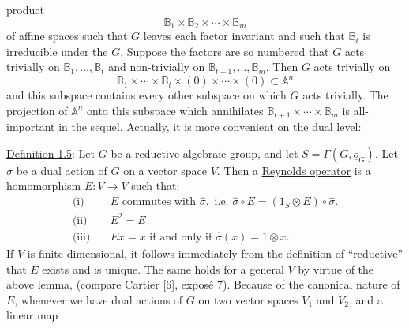 
product
\[
\mathbb B_1\times\mathbb B_2\times\cdots\times\mathbb B_m
\]
of affine spaces such that $G$ leaves each factor invariant and such that $\mathbb B_i$ is irreducible under the  $G$. Suppose the factors are so numbered that $G$ acts trivially on $\mathbb B_1,\ldots,\mathbb B_t$ and non-trivially on $\mathbb B_{t+1},\ldots,\mathbb B_m$. Then $G$ acts trivially on
\[
\mathbb B_1\times\cdots\times\mathbb B_t\times(0)\times\cdots\times(0)\subset\mathbb A^n
\]
and this subspace contains every other subspace on which $G$ acts trivially. The projection of $\mathbb A^n$ onto this subspace which annihilates $\mathbb B_{t+1}\times\cdots\times\mathbb B_m$ is all-important in the sequel. Actually, it is more convenient on the dual level:

\uline{Definition 1.5}: Let $G$ be a reductive algebraic group, and let $S=\Gamma(G,\underline{o}_G)$. Let $\hat\sigma$ be a dual action of $G$ on a vector space $V$. Then a \uline{Reynolds operator} is a homomorphism $E:V\longrightarrow V$ such that:
\[
\begin{aligned}
\text{(i)}\quad &E\text{ commutes with }\hat\sigma,\text{ i.e. }\hat\sigma\circ E=(1_S\otimes E)\circ\hat\sigma.\\
\text{(ii)}\quad &E^2=E\\
\text{(iii)}\quad &Ex=x\text{ if and only if }\hat\sigma(x)=1\otimes x.
\end{aligned}
\]
If $V$ is finite-dimensional, it follows immediately from the definition of ``reductive'' that $E$ exists and is unique. The same holds for a general $V$ by virtue of the above lemma, (compare Cartier [6], exposé 7). Because of the canonical nature of $E$, whenever we have dual actions of $G$ on two vector spaces $V_1$ and $V_2$, and a linear map

